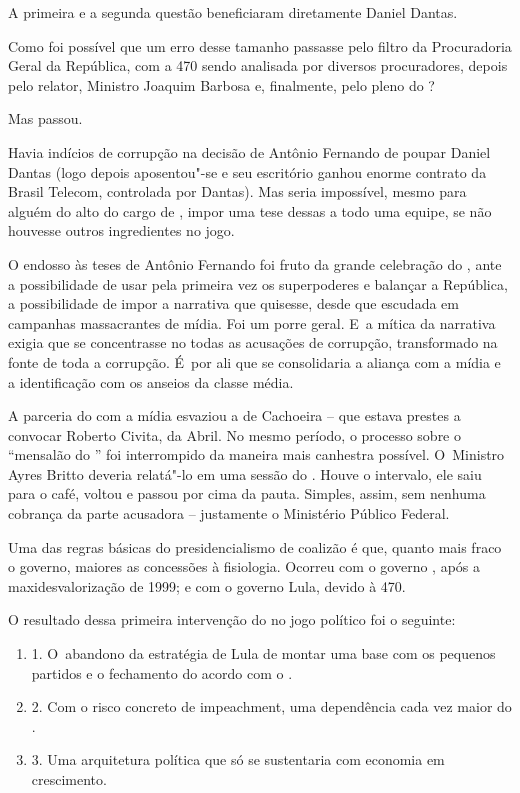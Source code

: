 A primeira e a segunda questão beneficiaram diretamente Daniel Dantas.

Como foi possível que um erro desse tamanho passasse pelo filtro da
Procuradoria Geral da República, com a  470 sendo analisada por
diversos procuradores, depois pelo relator, Ministro Joaquim Barbosa e,
finalmente, pelo pleno do ?

Mas passou.

Havia indícios de corrupção na decisão de Antônio Fernando de poupar
Daniel Dantas (logo depois aposentou"-se e seu escritório ganhou enorme
contrato da Brasil Telecom, controlada por Dantas). Mas seria
impossível, mesmo para alguém do alto do cargo de , impor uma tese
dessas a todo uma equipe, se não houvesse outros ingredientes no jogo.

O endosso às teses de Antônio Fernando foi fruto da grande celebração do
, ante a possibilidade de usar pela primeira vez os superpoderes e
balançar a República, a possibilidade de impor a narrativa que quisesse,
desde que escudada em campanhas massacrantes de mídia. Foi um porre
geral. E~a mítica da narrativa exigia que se concentrasse no  todas as
acusações de corrupção, transformado na fonte de toda a corrupção. É~por
ali que se consolidaria a aliança com a mídia e a identificação com os
anseios da classe média.

A parceria do  com a mídia esvaziou a  de Cachoeira -- que estava
prestes a convocar Roberto Civita, da Abril. No mesmo período, o
processo sobre o ``mensalão do '' foi interrompido da maneira mais
canhestra possível. O~Ministro Ayres Britto deveria relatá"-lo em uma
sessão do . Houve o intervalo, ele saiu para o café, voltou e passou
por cima da pauta. Simples, assim, sem nenhuma cobrança da parte
acusadora -- justamente o Ministério Público Federal.

Uma das regras básicas do presidencialismo de coalizão é que, quanto
mais fraco o governo, maiores as concessões à fisiologia. Ocorreu com o
governo , após a maxidesvalorização de 1999; e com o governo Lula,
devido à  470.

O resultado dessa primeira intervenção do  no jogo político foi o
seguinte:

\begin{enumerate}
\itemsep1pt\parskip0pt
\item
  1. O~abandono da estratégia de Lula de montar uma base com os pequenos
  partidos e o fechamento do acordo com o .
\item
  2. Com o risco concreto de impeachment, uma dependência cada vez maior
  do .
\item
  3. Uma arquitetura política que só se sustentaria com economia em
  crescimento.
\end{enumerate}


